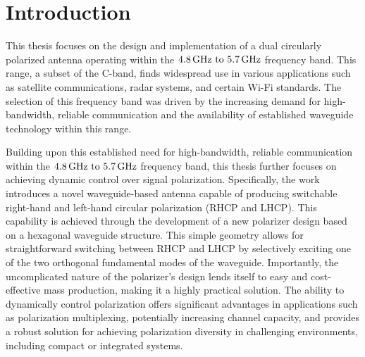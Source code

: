 \documentclass[14pt,a4paper]{ntust_report}
\begin{document}













\tableofcontents

\listoffigures

\chapter*{Introduction}
\label{chapter:introduction}

This thesis focuses on the design and implementation of a dual circularly polarized antenna operating within the $\frequencyrange$ frequency band. This range, a subset of the C-band, finds widespread use in various applications such as satellite communications, radar systems, and certain Wi-Fi standards. The selection of this frequency band was driven by the increasing demand for high-bandwidth, reliable communication and the availability of established waveguide technology within this range.

Building upon this established need for high-bandwidth, reliable communication within the $\frequencyrange$ frequency band, this thesis further focuses on achieving dynamic control over signal polarization. Specifically, the work introduces a novel waveguide-based antenna capable of producing switchable right-hand and left-hand circular polarization (RHCP and LHCP). This capability is achieved through the development of a new polarizer design based on a hexagonal waveguide structure. This simple geometry allows for straightforward switching between RHCP and LHCP by selectively exciting one of the two orthogonal fundamental modes of the waveguide. Importantly, the uncomplicated nature of the polarizer's design lends itself to easy and cost-effective mass production, making it a highly practical solution. The ability to dynamically control polarization offers significant advantages in applications such as polarization multiplexing, potentially increasing channel capacity, and provides a robust solution for achieving polarization diversity in challenging environments, including compact or integrated systems.
\end{document}
